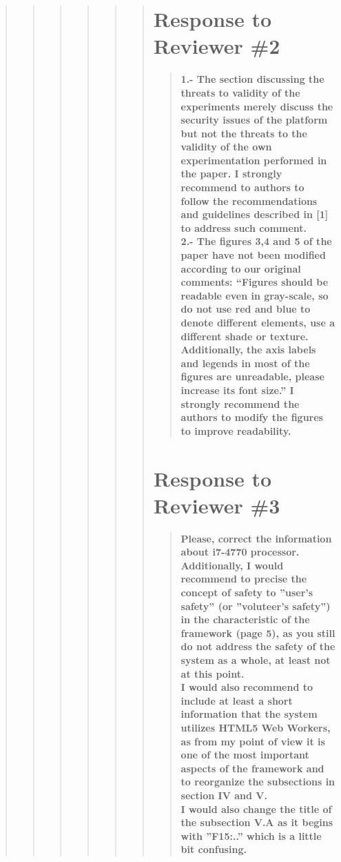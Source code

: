 \documentclass[preprint]{elsarticle}
\begin{document}
\begin{quote}
\begin{quote}
\begin{quote}
\begin{quote}
\begin{quote}
\begin{quote}
\section{Response to Reviewer \#2}


\begin{quote}
\textbf{1.- The section discussing the threats to validity of the experiments merely discuss the security issues of the platform but not the threats to the validity of the own experimentation performed in the paper. I strongly recommend to authors to follow the recommendations and guidelines described in [1] to address such comment.\\
2.- The figures 3,4 and 5 of the paper have not been modified according to our original comments: ``Figures should be readable even in gray-scale, so do not use red and blue to denote different elements, use a different shade or texture. Additionally, the axis labels and legends in most of the figures are unreadable, please increase its font size.'' I strongly recommend the authors to modify the figures to improve readability.}
\end{quote}



\section{Response to Reviewer \#3}


\begin{quote}
\textbf{Please, correct the information about i7-4770 processor. Additionally, I would recommend to precise the concept of safety to ''user's safety'' (or ''voluteer's safety'') in the characteristic of the framework (page 5), as you still do not address the safety of the system as a whole, at least not at this point.\\
I would also recommend to include at least a short information that the system utilizes HTML5 Web Workers, as from my point of view it is one of the most important aspects of the framework and to reorganize the subsections in section IV and V. \\
I would also change the title of the subsection V.A as it begins with ''F15:..'' which is a little bit confusing.}
\end{quote}




\end{quote}
\end{quote}
\end{quote}
\end{quote}
\end{quote}
\end{quote}
\end{document}
